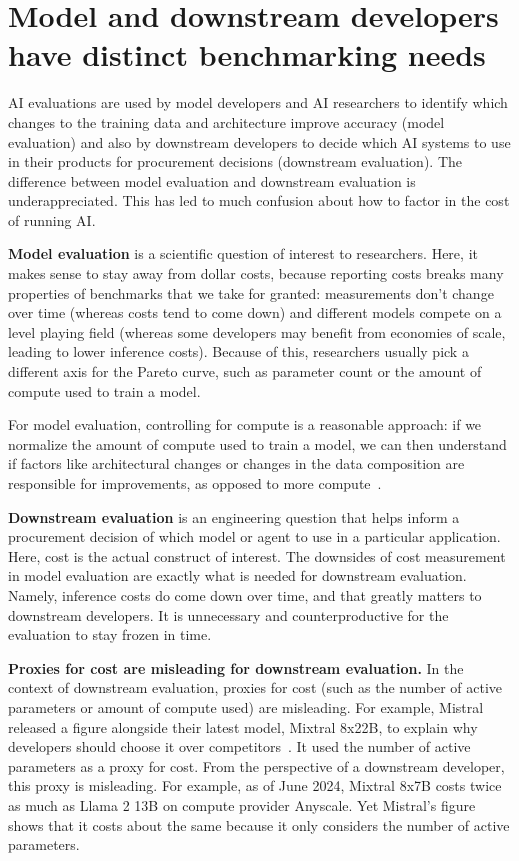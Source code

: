\documentclass{article}
\begin{document}
\section{Model  and downstream developers have distinct benchmarking needs }\label{sec:model-vs-downstream}

AI evaluations are used by model developers and AI researchers to identify which changes to the training data and architecture improve accuracy (model evaluation) and also by downstream developers to decide which AI systems to use in their products for procurement decisions (downstream evaluation). The difference between model evaluation and downstream evaluation is underappreciated. This has led to much confusion about how to factor in the cost of running AI. 

\textbf{Model evaluation} is a scientific question of interest to researchers. Here, it makes sense to stay away from dollar costs, because reporting costs breaks many properties of benchmarks that we take for granted: measurements don’t change over time (whereas costs tend to come down) and different models compete on a level playing field (whereas some developers may benefit from economies of scale, leading to lower inference costs). Because of this, researchers usually pick a different axis for the Pareto curve, such as parameter count or the amount of compute used to train a model.

For model evaluation, controlling for compute is a reasonable approach: if we normalize the amount of compute used to train a model, we can then understand if factors like architectural changes or changes in the data composition are responsible for improvements, as opposed to more compute~\citep{lambert_end_2024}. 

\textbf{Downstream evaluation} is an engineering question that helps inform a procurement decision of which model or agent to use in a particular application. Here, cost is the actual construct of interest. The downsides of cost measurement in model evaluation are exactly what is needed for downstream evaluation. Namely, inference costs do come down over time, and that greatly matters to downstream developers. It is unnecessary and counterproductive for the evaluation to stay frozen in time.

\textbf{Proxies for cost are misleading for downstream evaluation.}
In the context of downstream evaluation, proxies for cost (such as the number of active parameters or amount of compute used) are misleading. For example, Mistral released a figure alongside their latest model, Mixtral 8x22B, to explain why developers should choose it over competitors~\citep{mistral_ai_team_cheaper_2024}. It used the number of active parameters as a proxy for cost. From the perspective of a downstream developer, this proxy is misleading. For example, as of June 2024, Mixtral 8x7B costs twice as much as Llama 2 13B on compute provider Anyscale. Yet Mistral's figure shows that it costs about the same because it only considers the number of active parameters. 
\end{document}
